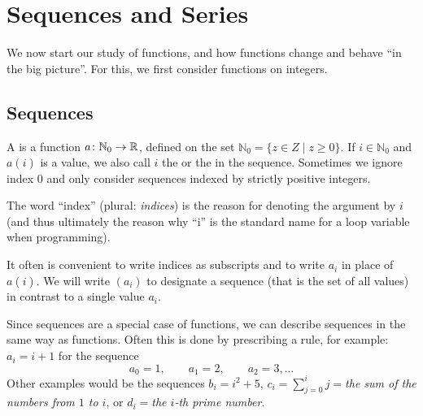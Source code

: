 \chapter{Sequences and Series}
\label{chseqs}

We now start our study of functions, and how functions change and behave ``in the big
picture''. For this, we first consider functions on integers.

\section{Sequences}
\label{secsequences}

\begin{defn}
A  is a function $a\colon \mathbb{N}_0\to{\mathbb R}$, defined on the
set $\mathbb{N}_0=\{z\in Z\mid
z\ge 0\}$. If $i\in \mathbb{N}_0$ and $a(i)$ is a value, we also call $i$ the  or
the  in the sequence.
Sometimes we ignore index $0$ and only consider sequences indexed by strictly positive
integers.
\end{defn}

The word ``index'' (plural: {\em indices}) is the reason for denoting the argument by $i$ (and thus ultimately
the reason why ``i'' is the standard name for a loop variable when programming).

It often is convenient to write indices as subscripts and to write $a_i$ in place of
$a(i)$. We will write $(a_i)$ to designate a sequence (that is the set of all values) in
contrast to a single value $a_i$.
\smallskip

Since sequences are a special case of functions, we can describe sequences in the same
way as functions. Often this is done by prescribing a rule, for example:
$a_i=i+1$ for the sequence
\[
a_0=1,\qquad a_1=2,\qquad a_2=3,\ldots
\]
Other examples would be the sequences $b_i=i^2+5$,
$\displaystyle c_i=\sum_{j=0}^i j=${\em the sum
of the numbers from $1$ to $i$}, or $d_i=${\em the $i$-th prime number}.
\smallskip

